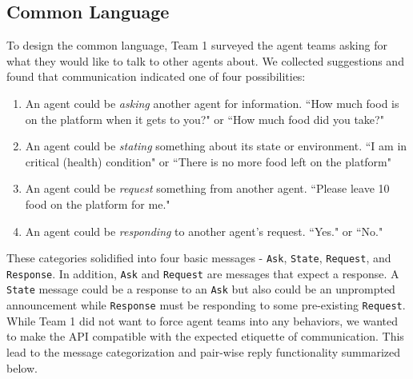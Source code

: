 \subsection{Common Language}
To design the common language, Team 1 surveyed the agent teams asking for what they would like to talk to other agents about. We collected suggestions and found that communication indicated one of four possibilities:
\begin{enumerate}
    \item An agent could be \textit{asking} another agent for information. ``How much food is on the platform when it gets to you?" or ``How much food did you take?"
    \item An agent could be \textit{stating} something about its state or environment. ``I am in critical (health) condition" or ``There is no more food left on the platform"
    \item An agent could be \textit{request} something from another agent. ``Please leave 10 food on the platform for me."
    \item An agent could be \textit{responding} to another agent's request. ``Yes." or ``No."
\end{enumerate}
These categories solidified into four basic messages - \texttt{Ask}, \texttt{State}, \texttt{Request}, and \texttt{Response}. \newline
In addition, \texttt{Ask} and \texttt{Request} are messages that expect a response. A \texttt{State} message could be a response to an \texttt{Ask} but also could be an unprompted announcement while \texttt{Response} must be responding to some pre-existing \texttt{Request}. \newline 
While Team 1 did not want to force agent teams into any behaviors, we wanted to make the API compatible with the expected etiquette of communication. This lead to the message categorization and pair-wise reply functionality summarized below.
